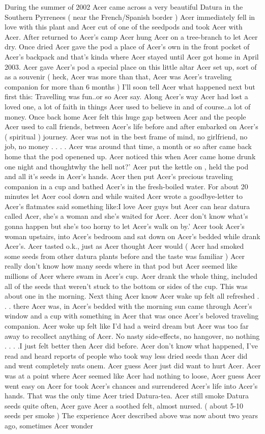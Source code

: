 \documentclass[12pt]{book}
\begin{document}
During the summer of 2002 Acer came across a very beautiful Datura in the Southern Pyrrenees ( near the French/Spanish border ) Acer immediately fell in love with this plant and Acer cut of one of the seedpods and took Acer with Acer. After returned to Acer's camp Acer hung Acer on a tree-branch to let Acer dry. Once dried Acer gave the pod a place of Acer's own in the front pocket of Acer's backpack and that's kinda where Acer stayed until Acer got home in April 2003. Acer gave Acer's pod a special place on this little altar Acer set up, sort of as a souvenir ( heck, Acer was more than that, Acer was Acer's traveling companion for more than 6 months ) I'll soon tell Acer what happened next but first this: Travelling was fun..or so Acer say. Along Acer's way Acer had lost a loved one, a lot of faith in things Acer used to believe in and of course..a lot of money. Once back home Acer felt this huge gap between Acer and the people Acer used to call friends, between Acer's life before and after embarked on Acer's ( spiritual ) journey. Acer was not in the best frame of mind, no girlfriend, no job, no money . . .  . Acer was around that time, a month or so after came back home that the pod openened up. Acer noticed this when Acer came home drunk one night and thoughtwhy the hell not?' Acer put the kettle on , held the pod and all it's seeds in Acer's hands. Acer then put Acer's precious traveling companion in a cup and bathed Acer's in the fresh-boiled water. For about 20 minutes let Acer cool down and while waited Acer wrote a goodbye-letter to Acer's flatmates said something like:I love Acer guys but Acer can hear datura called Acer, she's a woman and she's waited for Acer. Acer don't know what's gonna happen but she's too horny to let Acer's walk on by.' Acer took Acer's woman upstairs, into Acer's bedroom and sat down on Acer's bedded while drank Acer's. Acer tasted o.k., just as Acer thought Acer would ( Acer had smoked some seeds from other datura plants before and the taste was familiar ) Acer really don't know how many seeds where in that pod but Acer seemed like millions of Acer where swam in Acer's cup. Acer drank the whole thing, included all of the seeds that weren't stuck to the bottom or sides of the cup. This was about one in the morning. Next thing Acer know Acer wake up felt all refreshed . . .  there Acer was, in Acer's bedded with the morning sun came through Acer's window and a cup with something in Acer that was once Acer's beloved traveling companion. Acer woke up felt like I'd had a weird dream but Acer was too far away to recollect anything of Acer. No nasty side-effects, no hangover, no nothing . . .  .I just felt better then Acer did before. Acer don't know what happened, I've read and heard reports of people who took way less dried seeds than Acer did and went completely nuts onem. Acer guess Acer just did want to hurt Acer. Acer was at a point where Acer seemed like Acer had nothing to loose, Acer guess Acer went easy on Acer for took Acer's chances and surrendered Acer's life into Acer's hands. That was the only time Acer tried Datura-tea. Acer still smoke Datura seeds quite often, Acer gave Acer a soothed felt, almost nursed. (  about 5-10 seeds per smoke ) The experience Acer described above was now about two years ago, sometimes Acer wonder 
\end{document}
